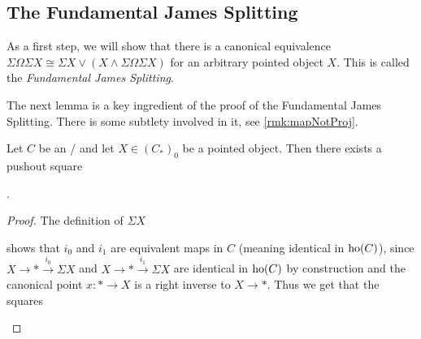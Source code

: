 \subsection*{The Fundamental James Splitting}
As a first step, we will show that there is a canonical equivalence $\Sigma\Omega\Sigma X\cong\Sigma X\vee\left(X\wedge\Sigma\Omega\Sigma X\right)$ for an arbitrary pointed object $X$.
This is called the \emph{Fundamental James Splitting}.

The next lemma is a key ingredient of the proof of the Fundamental James Splitting.
There is some subtlety involved in it, see \cref{rmk:mapNotProj}.
\begin{lemma}\label{lem:existenceOfPoSq}
    Let $C$ be an \inftytop/ and let $X\in \left(C_*\right)_0$ be a pointed object.
    Then there exists a pushout square  
    \begin{center}
        \;.
    \end{center}
    \begin{proof}
        The definition of $\Sigma X$
        \begin{center}
        \end{center}
        shows that $i_0$ and $i_1$ are equivalent maps in $C$ (meaning identical in $\operatorname{ho}(C)$), since $X\to *\xrightarrow{i_0}\Sigma X$ and $X\to *\xrightarrow{i_1}\Sigma X$ are identical in $\operatorname{ho}(C)$ by construction and the canonical point $x\colon*\to X$ is a right inverse to $X\to *$.
        Thus we get that the squares
        \begin{center}

\end{center}
\end{proof}
\end{lemma}
